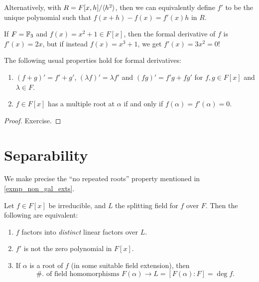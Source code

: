\begin{remark}
    Alternatively, with $R = F[x, h]/\langle {h^2} \rangle$, then we can equivalently define $f'$ to be the unique polynomial such that $f(x + h) - f(x) = f'(x)h$ in $R$.
\end{remark}

\begin{example}
    If $F = \mathbb{{F}}_3$ and $f(x) = x^2 + 1 \in F[x]$, then the formal derivative of $f$ is $f'(x) = 2x$, but if instead $f(x) = x^3 + 1$, we get $f'(x) = 3x^2 = 0$!
\end{example}

\begin{proposition}
\label{prop_derivative}
    The following usual properties hold for formal derivatives:
    \begin{enumerate}[label=(\alph*)]
        \item $(f + g)' = f' + g'$, $(\lambda f)' = \lambda f'$ and $(fg)' = f'g + fg'$ for $f, g \in F[x]$ and $\lambda \in F$.
        \item $f \in F[x]$ has a multiple root at $\alpha$ if and only if $f(\alpha) = f'(\alpha) = 0$.
    \end{enumerate}
\end{proposition}

\begin{proof}
    Exercise.
\end{proof}

\section{Separability}

We make precise the ``no repeated roots'' property mentioned in \cref{exmp_non_gal_exts}.

\begin{proposition}
\label{prop_separability_conditions}
    Let $f \in F[x]$ be irreducible, and $L$ the splitting field for $f$ over $F$. Then the following are equivalent:
    \begin{enumerate}[label=(\alph*)]
        \item $f$ factors into \emph{distinct} linear factors over $L$.
        \item $f'$ is not the zero polynomial in $F[x]$.
        \item If $\alpha$ is a root of $f$ (in some suitable field extension), then
        \[
            \#. \text{ of field homomorphisms } F(\alpha) \to L = [F(\alpha) : F] = \deg{f}.
        \]
    \end{enumerate}
\end{proposition}


